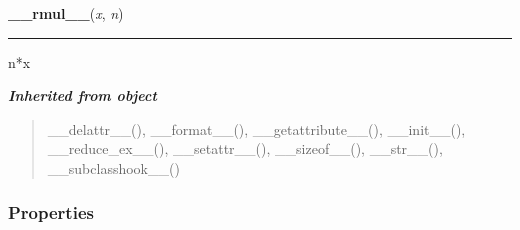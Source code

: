 \hspace{.8\funcindent}\begin{boxedminipage}{\funcwidth}

    \raggedright \textbf{\_\_rmul\_\_}(\textit{x}, \textit{n})

    \vspace{-1.5ex}

    \rule{\textwidth}{0.5\fboxrule}
\setlength{\parskip}{2ex}
    n*x

\setlength{\parskip}{1ex}
    \end{boxedminipage}


\large{\textbf{\textit{Inherited from object}}}

\begin{quote}
\_\_delattr\_\_(), \_\_format\_\_(), \_\_getattribute\_\_(), \_\_init\_\_(), \_\_reduce\_ex\_\_(), \_\_setattr\_\_(), \_\_sizeof\_\_(), \_\_str\_\_(), \_\_subclasshook\_\_()
\end{quote}


  \subsubsection{Properties}

